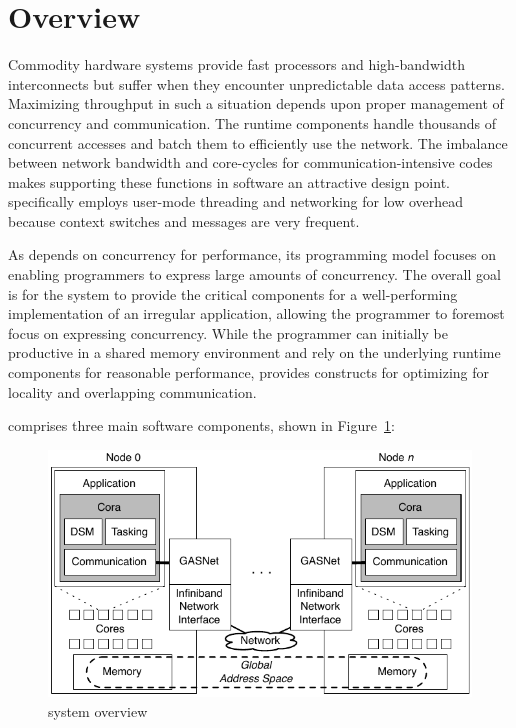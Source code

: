 \section{\Grappa Overview}

Commodity hardware systems provide fast processors and high-bandwidth
interconnects but suffer when they encounter unpredictable data access
patterns. Maximizing throughput in such a situation depends upon proper
management of concurrency and communication. The \Grappa runtime
components handle thousands of concurrent accesses and batch them to
efficiently use the network. The imbalance between network bandwidth
and core-cycles for communication-intensive codes makes supporting
these functions in software an attractive design point. 
\Grappa specifically employs user-mode threading and networking for
low overhead because context switches and messages are very frequent.

As \Grappa depends on concurrency for performance, its programming
model focuses on enabling programmers to express large amounts of
concurrency. The overall goal is for the system to provide the
critical components for a well-performing implementation of an
irregular application, allowing the programmer to foremost focus on
expressing concurrency. While the programmer can initially be
productive in a shared memory environment and rely on the
underlying runtime components for reasonable performance, \Grappa
provides constructs for optimizing for locality and overlapping
communication.
 
\Grappa comprises three main software components, shown in Figure~\ref{fig:grappa}:

\begin{figure}[t]
\begin{center}
  \includegraphics[width=0.95\columnwidth]{figs/system-overview}
\begin{minipage}{0.95\columnwidth}
  \caption{\label{fig:grappa} \Grappa system overview}
\end{minipage}
\vspace{-3ex}
\end{center}
\end{figure}


